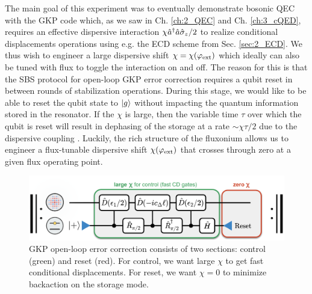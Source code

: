 The main goal of this experiment was to eventually demonstrate bosonic QEC with the GKP code which, as we saw in Ch. \ref{ch:2_QEC} and Ch. \ref{ch:3_cQED}, requires an effective dispersive interaction $\chi\hat{a}^\dagger\hat{a}\hat{\sigma}_z/2$ to realize conditional displacements operations using e.g. the ECD scheme from Sec. \ref{sec:2_ECD}. We thus wish to engineer a large dispersive shift $\chi = \chi(\varphi_{\rm ext})$ which ideally can also be tuned with flux to toggle the interaction on and off. The reason for this is that the SBS protocol for open-loop GKP error correction requires a qubit reset in between rounds of stabilization operations. During this stage, we would like to be able to reset the qubit state to $\lvert g\rangle$ without impacting the quantum information stored in the resonator. If the $\chi$ is large, then the variable time $\tau$ over which the qubit is reset will result in dephasing of the storage at a rate $\sim \chi\tau/2$ due to the dispersive coupling \cite{sivak2023gkp-expt, nordquantique2023gkp-expt}. Luckily, the rich structure of the fluxonium allows us to engineer a flux-tunable dispersive shift $\chi(\varphi_{\rm ext})$ that crosses through zero at a given flux operating point. 
\begin{figure}[h]
    \centering
    \includegraphics[width=0.85\linewidth]{Figures/4/SBS_Control_and_Reset.pdf}
    \caption{GKP open-loop error correction consists of two sections: control (green) and reset (red). For control, we want large $\chi$ to get fast conditional displacements. For reset, we want $\chi = 0$ to minimize backaction on the storage mode.}
    \label{fig:4_SBS_Control_and_Reset}
\end{figure}

